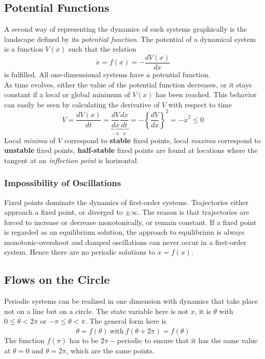 \subsection{Potential Functions}{\label{sec:pf}}
A second way of representing the dynamics of such systems graphically is the landscape defined by its \emph{potential function}.
The potential of a dynamical system is a function $V(x)$ such that the relation
\begin{equation}
  \dot{x}=f(x)= -\frac{dV(x)}{dx}
\end{equation}
is fulfilled.
All one-dimensional systems have a potential function.\\
As time evolves, either the value of the potential function decreases, or it stays constant if a local or global minimum of $V(x)$ has been reached.
This behavior can easily be seen by calculating the derivative of $V$ with respect to time
\begin{equation}
  \dot{V}=\frac{dV(x)}{dt}=\underbrace{\frac{dV}{dx}}_{-\dot{x}}\underbrace{\frac{dx}{dt}}_{\dot{x}}=-\left\{\frac{dV}{dx}\right\}^2=-\dot{x}^2\leq0
\end{equation}
Local \emph{minima} of $V$ correspond to {\textbf{stable}} fixed points, local \emph{maxima} correspond to {\textbf{unstable}} fixed points, {\textbf{half-stable}} fixed points are found at locations where the tangent at an \emph{inflection point} is horizontal.
\subsubsection{Impossibility of Oscillations}
Fixed points dominate the dynamics of first-order systems.
Trajectories either approach a fixed point, or diverged to $\pm\infty$.
The reason is that trajectories are forced to increase or decrease monotonically, or remain constant.
If a fixed point is regarded as an equilibrium solution, the approach to equilibrium is always monotonic-overshoot and damped oscillations can never occur in a first-order system.
Hence there are no periodic solutions to $\dot{x}=f(x)$.
\subsection{Flows on the Circle}
Periodic systems can be realized in one dimension with dynamics that take place not on a line but on a circle.
The state variable here is not $x$, it is $\theta$ with $0\leq\theta<2\pi$ or $-\pi\leq\theta<\pi$.
The general form here is
\begin{equation}
  \dot{\theta}=f(\theta)\ \text{with}\ f(\theta+2\pi)=f(\theta)
\end{equation}
The function $f(\pi)$ has to be $2\pi-$periodic to ensure that it has the same value at $\theta=0$ and $\theta=2\pi$, which are the same points.
